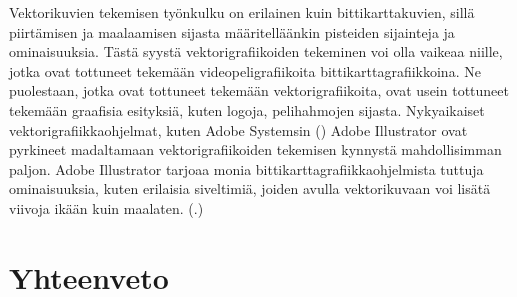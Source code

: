 \documentclass[utf8,bachelor]{gradu3}
\newcommand{\parencitedot}[1]{(\cite{#1}.)}
\begin{document}
Vektorikuvien tekemisen työnkulku on erilainen kuin bittikarttakuvien, sillä piirtämisen ja maalaamisen sijasta määritelläänkin pisteiden sijainteja ja ominaisuuksia. Tästä syystä vektorigrafiikoiden tekeminen voi olla vaikeaa niille, jotka ovat tottuneet tekemään videopeligrafiikoita bittikarttagrafiikkoina. Ne puolestaan, jotka ovat tottuneet tekemään vektorigrafiikoita, ovat usein tottuneet tekemään graafisia esityksiä, kuten logoja, pelihahmojen sijasta. Nykyaikaiset vektorigrafiikkaohjelmat, kuten Adobe Systemsin (\citeyear{RefWorks:doc:5bf1ca5ee4b03fd0c4891238}) Adobe Illustrator ovat pyrkineet madaltamaan vektorigrafiikoiden tekemisen kynnystä mahdollisimman paljon. Adobe Illustrator tarjoaa monia bittikarttagrafiikkaohjelmista tuttuja ominaisuuksia, kuten erilaisia siveltimiä, joiden avulla vektorikuvaan voi lisätä viivoja ikään kuin maalaten. \parencitedot{RefWorks:doc:5bf1ca5ee4b03fd0c4891238}

\chapter{Yhteenveto}


\printbibliography
\end{document}
